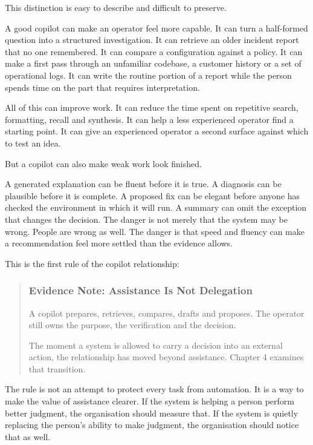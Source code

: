 This distinction is easy to describe and difficult to preserve.

A good copilot can make an operator feel more capable. It can turn a
half-formed question into a structured investigation. It can retrieve an
older incident report that no one remembered. It can compare a
configuration against a policy. It can make a first pass through an
unfamiliar codebase, a customer history or a set of operational logs. It
can write the routine portion of a report while the person spends time
on the part that requires interpretation.

All of this can improve work. It can reduce the time spent on repetitive
search, formatting, recall and synthesis. It can help a less experienced
operator find a starting point. It can give an experienced operator a
second surface against which to test an idea.

But a copilot can also make weak work look finished.

A generated explanation can be fluent before it is true. A diagnosis can
be plausible before it is complete. A proposed fix can be elegant before
anyone has checked the environment in which it will run. A summary can
omit the exception that changes the decision. The danger is not merely
that the system may be wrong. People are wrong as well. The danger is
that speed and fluency can make a recommendation feel more settled than
the evidence allows.

This is the first rule of the copilot relationship:

\begin{quote}
\subsubsection{Evidence Note: Assistance Is Not
Delegation}\label{evidence-note-assistance-is-not-delegation}

A copilot prepares, retrieves, compares, drafts and proposes. The
operator still owns the purpose, the verification and the decision.

The moment a system is allowed to carry a decision into an external
action, the relationship has moved beyond assistance. Chapter 4 examines
that transition.
\end{quote}

The rule is not an attempt to protect every task from automation. It is
a way to make the value of assistance clearer. If the system is helping
a person perform better judgment, the organisation should measure that.
If the system is quietly replacing the person's ability to make
judgment, the organisation should notice that as well.

